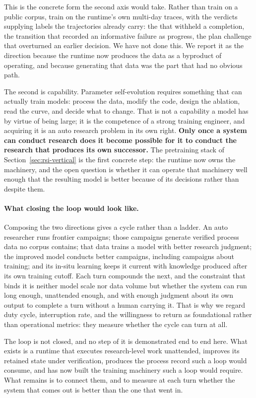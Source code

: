 This is the concrete form the second axis would take. Rather than train on a public
corpus, train on the runtime's own multi-day traces, with the verdicts supplying
labels the trajectories already carry: the  that withheld a completion,
the transition that recorded an informative failure as progress, the plan challenge
that overturned an earlier decision. We have not done this. We report it as the
direction because the runtime now produces the data as a byproduct of operating, and
because generating that data was the part that had no obvious path.

The second is capability. Parameter self-evolution requires something that can
actually train models: process the data, modify the code, design the ablation, read
the curve, and decide what to change. That is not a capability a model has by virtue
of being large; it is the competence of a strong training engineer, and acquiring it
is an auto research problem in its own right. \textbf{Only once a system can conduct
research does it become possible for it to conduct the research that produces its own
successor.} The pretraining stack of Section~\ref{sec:rsi-vertical} is the first
concrete step: the runtime now owns the machinery, and the open question is whether
it can operate that machinery well enough that the resulting model is better because
of its decisions rather than despite them.

\paragraph{What closing the loop would look like.}
Composing the two directions gives a cycle rather than a ladder. An auto researcher
runs frontier campaigns; those campaigns generate verified process data no corpus
contains; that data trains a model with better research judgment; the improved model
conducts better campaigns, including campaigns about training; and its in-situ
learning keeps it current with knowledge produced after its own training cutoff. Each
turn compounds the next, and the constraint that binds it is neither model scale nor
data volume but whether the system can run long enough, unattended enough, and with
enough judgment about its own output to complete a turn without a human carrying it.
That is why we regard duty cycle, interruption rate, and the willingness to return
 as foundational rather than operational metrics: they measure whether
the cycle can turn at all.

The loop is not closed, and no step of it is demonstrated end to end here. What
exists is a runtime that executes research-level work unattended, improves its
retained state under verification, produces the process record such a loop would
consume, and has now built the training machinery such a loop would require. What
remains is to connect them, and to measure at each turn whether the system that
comes out is better than the one that went in.

